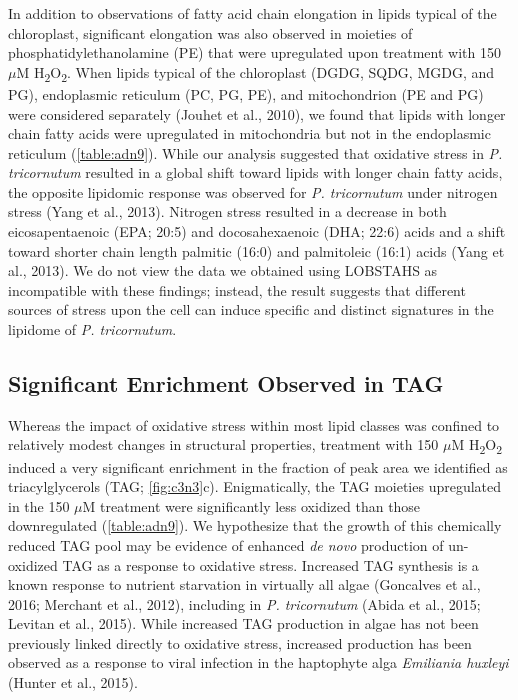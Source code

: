 In addition to observations of fatty acid chain elongation in lipids typical of the chloroplast, significant elongation was also observed in moieties of phosphatidylethanolamine (PE) that were upregulated upon treatment with 150 $\mu$M H\textsubscript{2}O\textsubscript{2}. When lipids typical of the chloroplast (DGDG, SQDG, MGDG, and PG), endoplasmic reticulum (PC, PG, PE), and mitochondrion (PE and PG) were considered separately (Jouhet et al., 2010), we found that lipids with longer chain fatty acids were upregulated in mitochondria but not in the endoplasmic reticulum (\autoref{table:adn9}). While our analysis suggested that oxidative stress in \emph{P. tricornutum} resulted in a global shift toward lipids with longer chain fatty acids, the opposite lipidomic response was observed for \emph{P. tricornutum} under nitrogen stress (Yang et al., 2013). Nitrogen stress resulted in a decrease in both eicosapentaenoic (EPA; 20:5) and docosahexaenoic (DHA; 22:6) acids and a shift toward shorter chain length palmitic (16:0) and palmitoleic (16:1) acids (Yang et al., 2013). We do not view the data we obtained using LOBSTAHS as incompatible with these findings; instead, the result suggests that different sources of stress upon the cell can induce specific and distinct signatures in the lipidome of \emph{P. tricornutum}.

\subsection{Significant Enrichment Observed in TAG}

Whereas the impact of oxidative stress within most lipid classes was confined to relatively modest changes in structural properties, treatment with 150 $\mu$M H\textsubscript{2}O\textsubscript{2} induced a very significant enrichment in the fraction of peak area we identified as triacylglycerols (TAG; \autoref{fig:c3n3}c). Enigmatically, the TAG moieties upregulated in the 150 $\mu$M treatment were significantly less oxidized than those downregulated (\autoref{table:adn9}). We hypothesize that the growth of this chemically reduced TAG pool may be evidence of enhanced \emph{de novo} production of un-oxidized TAG as a response to oxidative stress. Increased TAG synthesis is a known response to nutrient starvation in virtually all algae (Goncalves et al., 2016; Merchant et al., 2012), including in \emph{P. tricornutum} (Abida et al., 2015; Levitan et al., 2015). While increased TAG production in algae has not been previously linked directly to oxidative stress, increased production has been observed as a response to viral infection in the haptophyte alga \emph{Emiliania huxleyi} (Hunter et al., 2015).

